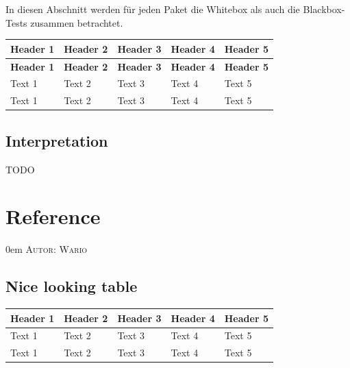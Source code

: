 \documentclass{article}
\makeatletter
\newcommand{\sectionauthor}[1]{
	{\parindent 0em \large \scshape Autor: #1 \par \nobreak \vspace*{1em}}
	\@afterheading
}
\makeatother
\begin{document}
In diesen Abschnitt werden für jeden Paket die Whitebox als auch die Blackbox-Tests zusammen betrachtet.

\begin{longtable}{@{}lllll@{}}
\toprule
\textbf{Header 1} & \textbf{Header 2} & \textbf{Header 3} & \textbf{Header 4} & \textbf{Header 5} \\* \midrule
\endfirsthead
\textbf{Header 1} & \textbf{Header 2} & \textbf{Header 3} & \textbf{Header 4} & \textbf{Header 5} \\* \midrule
\endhead
Text 1            & Text 2            & Text 3            & Text 4            & Text 5            \\
Text 1            & Text 2            & Text 3            & Text 4            & Text 5            \\* \bottomrule
\end{longtable}

\subsection{Interpretation}

TODO

\newpage

\section{Reference}
\sectionauthor{Wario}

\subsection{Nice looking table}
\begin{longtable}{@{}lllll@{}}
\toprule
\textbf{Header 1} & \textbf{Header 2} & \textbf{Header 3} & \textbf{Header 4} & \textbf{Header 5} \\* \midrule
\endfirsthead
%
\endhead
%
Text 1            & Text 2            & Text 3            & Text 4            & Text 5            \\
Text 1            & Text 2            & Text 3            & Text 4            & Text 5            \\* \bottomrule
\end{longtable}
\end{document}
